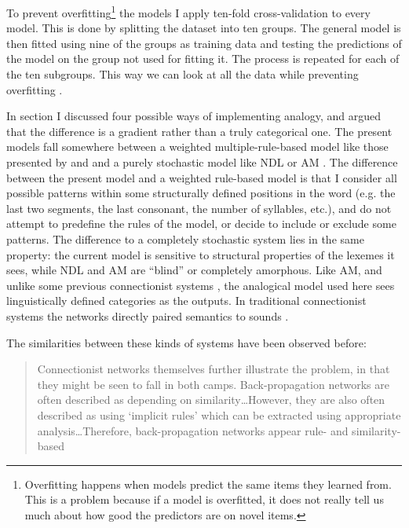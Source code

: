 To prevent overfitting\footnote{Overfitting happens when models predict the same items they learned from. This is a problem because if a model is overfitted, it does not really tell us much about how good the predictors are on novel items.} the models I apply ten-fold cross-validation to every model. This is done by splitting the dataset into ten groups. The general model is then fitted using nine of the groups as training data and testing the predictions of the model on the group not used for fitting it. The process is repeated for each of the ten subgroups. This way we can look at all the data while preventing  overfitting \autocite{Kohavi.1995}.

In section  I discussed four possible ways of implementing analogy, and argued that the difference is a gradient rather than a truly categorical one. The present models fall somewhere between a weighted multiple-rule-based model like those presented by \textcite{Albright.2003} and \textcite{Albright.2009} and a purely stochastic model like NDL \autocites{Arppe.2014, Baayen.2011, Baayen.2011a} or AM \autocites{Skousen.1989, Skousen.2002, Skousen.2013, Arndt-Lappe.2011, Arndt-Lappe.2014}. The difference between the present model and a weighted rule-based model is that I consider all possible patterns within some structurally defined positions in the word (e.g. the last two segments, the last consonant, the number of syllables, etc.), and do not attempt to predefine the rules of the model, or decide to include or exclude some patterns. The difference to a completely stochastic system lies in the same property: the current model is sensitive to structural properties of the lexemes it sees, while NDL and AM are ``blind'' or completely amorphous. Like AM, and unlike some previous connectionist systems \autocite{Bechtel.2002, Churchland.1989, McClelland.1986, Rumelhart.1986}, the analogical model used here sees linguistically defined categories as the outputs. In traditional connectionist systems the networks directly paired semantics to sounds \autocite{Matthews.2005}.

The similarities between these kinds of systems have been observed before:

\begin{quotation}
Connectionist  networks  themselves  further  illustrate  the  problem,  in  that  they might be seen to fall in both camps. Back-propagation networks are often described as  depending  on  similarity\dots  However,  they  are  also often described as using ‘implicit rules’ which can be extracted using appropriate analysis\dots Therefore, back-propagation networks appear rule- and similarity-based \autocite[200]{Hahn.1998}
\end{quotation}

